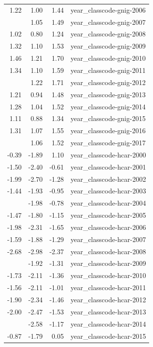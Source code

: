 \documentclass[]{article}
\begin{document}
\begin{longtable}[t]{rrrl}
1.22 & 1.00 & 1.44 & year\_classcode-gnig-2006\\
\addlinespace
1.27 & 1.05 & 1.49 & year\_classcode-gnig-2007\\
1.02 & 0.80 & 1.24 & year\_classcode-gnig-2008\\
1.32 & 1.10 & 1.53 & year\_classcode-gnig-2009\\
1.46 & 1.21 & 1.70 & year\_classcode-gnig-2010\\
1.34 & 1.10 & 1.59 & year\_classcode-gnig-2011\\
\addlinespace
1.46 & 1.22 & 1.71 & year\_classcode-gnig-2012\\
1.21 & 0.94 & 1.48 & year\_classcode-gnig-2013\\
1.28 & 1.04 & 1.52 & year\_classcode-gnig-2014\\
1.11 & 0.88 & 1.34 & year\_classcode-gnig-2015\\
1.31 & 1.07 & 1.55 & year\_classcode-gnig-2016\\
\addlinespace
1.29 & 1.06 & 1.52 & year\_classcode-gnig-2017\\
-0.39 & -1.89 & 1.10 & year\_classcode-hcar-2000\\
-1.50 & -2.40 & -0.61 & year\_classcode-hcar-2001\\
-1.99 & -2.70 & -1.28 & year\_classcode-hcar-2002\\
-1.44 & -1.93 & -0.95 & year\_classcode-hcar-2003\\
\addlinespace
-1.38 & -1.98 & -0.78 & year\_classcode-hcar-2004\\
-1.47 & -1.80 & -1.15 & year\_classcode-hcar-2005\\
-1.98 & -2.31 & -1.65 & year\_classcode-hcar-2006\\
-1.59 & -1.88 & -1.29 & year\_classcode-hcar-2007\\
-2.68 & -2.98 & -2.37 & year\_classcode-hcar-2008\\
\addlinespace
-1.61 & -1.92 & -1.31 & year\_classcode-hcar-2009\\
-1.73 & -2.11 & -1.36 & year\_classcode-hcar-2010\\
-1.56 & -2.11 & -1.01 & year\_classcode-hcar-2011\\
-1.90 & -2.34 & -1.46 & year\_classcode-hcar-2012\\
-2.00 & -2.47 & -1.53 & year\_classcode-hcar-2013\\
\addlinespace
-1.87 & -2.58 & -1.17 & year\_classcode-hcar-2014\\
-0.87 & -1.79 & 0.05 & year\_classcode-hcar-2015\\

\end{longtable}
\end{document}
